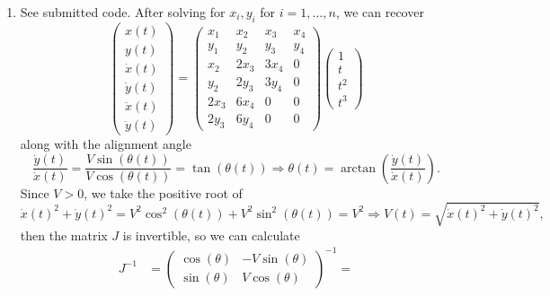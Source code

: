 \documentclass[12pt]{article}
\begin{document}
\begin{enumerate}
\begin{align*}
\begin{array}{c}
		-0.5
		\end{array}\right) =
		\left(\begin{array}{c}
		y(0) \\
		y(t_f) \\
		\dot y(0) \\
		\dot y(t_f)
		\end{array}\right)
	\end{align*}
	We cannot set $V(t_f) = 0$ because then $J$ would be singular at time $t_f$, and we could not recover the flat outputs from the virtual control inputs.
	\item See submitted code. After solving for $x_i,y_i$ for $i = 1,\ldots,n$, we can recover
	\[
		\left(\begin{array}{c}
		x(t) \\
		y(t) \\
		\dot x(t) \\
		\dot y(t) \\
		\ddot x(t) \\
		\ddot y(t)
		\end{array}\right) =
		\left(\begin{array}{cccc}
		x_1 & x_2 & x_3 & x_4 \\
		y_1 & y_2 & y_3 & y_4 \\
		x_2 & 2x_3 & 3x_4 & 0 \\
		y_2 & 2y_3 & 3y_4 & 0 \\
		2x_3 & 6x_4 & 0 & 0 \\
		2y_3 & 6y_4 & 0 & 0
		\end{array}\right)
		\left(\begin{array}{c}
		1 \\
		t \\
		t^2 \\
		t^3
		\end{array}\right)
	\]
	along with the alignment angle
	\[
		\frac{\dot y(t)}{\dot x(t)} = \frac{V\sin(\theta(t))}{V\cos(\theta(t))} = \tan(\theta(t)) \Rightarrow \theta(t) = \arctan\left(\frac{\dot y(t)}{\dot x(t)}\right).
	\]
	Since $V > 0$, we take the positive root of
	\[
		\dot x(t)^2 + \dot y(t)^2 = V^2\cos^2(\theta(t)) + V^2\sin^2(\theta(t)) = V^2 \Rightarrow V(t) = \sqrt{\dot x(t)^2 + \dot y(t)^2},
	\]
	then the matrix $J$ is invertible, so we can calculate
	\begin{align*}
		J^{-1} &= \left(\begin{array}{cc}
		\cos(\theta) & -V\sin(\theta) \\
		\sin(\theta) & V\cos(\theta)
		\end{array}\right)^{-1} = 

\end{align*}
\end{enumerate}
\end{document}
